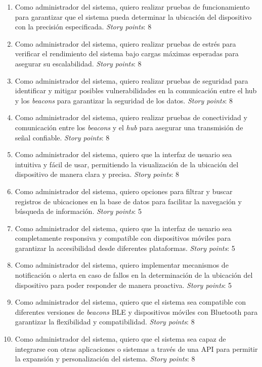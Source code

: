 \documentclass[
11pt, %
]{charter}
\begin{document}
\begin{enumerate}
	\item Como administrador del sistema, quiero realizar pruebas de funcionamiento para garantizar que el sistema pueda determinar la ubicación del dispositivo con la precisión especificada. \textit{Story points}: 8
	\item Como administrador del sistema, quiero realizar pruebas de estrés para verificar el rendimiento del sistema bajo cargas máximas esperadas para asegurar su escalabilidad. \textit{Story points}: 8
	\item Como administrador del sistema, quiero realizar pruebas de seguridad para identificar y mitigar posibles vulnerabilidades en la comunicación entre el hub y los \textit{beacons} para garantizar la seguridad de los datos. \textit{Story points}: 8
	\item Como administrador del sistema, quiero realizar pruebas de conectividad y comunicación entre los \textit{beacons} y el \textit{hub} para asegurar una transmisión de señal confiable. \textit{Story points}: 8
	\item Como administrador del sistema, quiero que la interfaz de usuario sea intuitiva y fácil de usar, permitiendo la visualización de la ubicación del dispositivo de manera clara y precisa. \textit{Story points}: 8
	\item Como administrador del sistema, quiero opciones para filtrar y buscar registros de ubicaciones en la base de datos para facilitar la navegación y búsqueda de información. \textit{Story points}: 5
	\item Como administrador del sistema, quiero que la interfaz de usuario sea completamente responsiva y compatible con dispositivos móviles para garantizar la accesibilidad desde diferentes plataformas. \textit{Story points}: 5
	\item Como administrador del sistema, quiero implementar mecanismos de notificación o alerta en caso de fallos en la determinación de la ubicación del dispositivo para poder responder de manera proactiva. \textit{Story points}: 5
	\item Como administrador del sistema, quiero que el sistema sea compatible con diferentes versiones de \textit{beacons} BLE y dispositivos móviles con Bluetooth para garantizar la flexibilidad y compatibilidad. \textit{Story points}: 8
	\item Como administrador del sistema, quiero que el sistema sea capaz de integrarse con otras aplicaciones o sistemas a través de una API para permitir la expansión y personalización del sistema. \textit{Story points}: 8

\end{enumerate}
\end{document}
